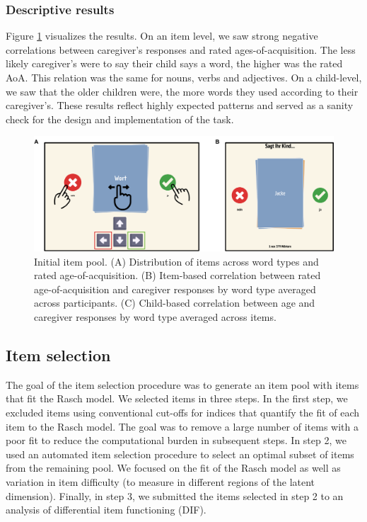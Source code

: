 \documentclass[
  man,floatsintext]{apa6}
\begin{document}
\hypertarget{descriptive-results}{%
\subsubsection{Descriptive results}\label{descriptive-results}}

Figure \ref{fig:fig2} visualizes the results. On an item level, we saw strong negative correlations between caregiver's responses and rated ages-of-acquisition. The less likely caregiver's were to say their child says a word, the higher was the rated AoA. This relation was the same for nouns, verbs and adjectives. On a child-level, we saw that the older children were, the more words they used according to their caregiver's. These results reflect highly expected patterns and served as a sanity check for the design and implementation of the task.



\begin{figure}

{\centering \includegraphics[width=1\linewidth]{../graphs/fig2} 

}

\caption{Initial item pool. (A) Distribution of items across word types and rated age-of-acquisition. (B) Item-based correlation between rated age-of-acquisition and caregiver responses by word type averaged across participants. (C) Child-based correlation between age and caregiver responses by word type averaged across items.}\label{fig:fig2}
\end{figure}

\hypertarget{item-selection}{%
\subsection{Item selection}\label{item-selection}}

The goal of the item selection procedure was to generate an item pool with items that fit the Rasch model. We selected items in three steps. In the first step, we excluded items using conventional cut-offs for indices that quantify the fit of each item to the Rasch model. The goal was to remove a large number of items with a poor fit to reduce the computational burden in subsequent steps. In step 2, we used an automated item selection procedure to select an optimal subset of items from the remaining pool. We focused on the fit of the Rasch model as well as variation in item difficulty (to measure in different regions of the latent dimension). Finally, in step 3, we submitted the items selected in step 2 to an analysis of differential item functioning (DIF).
\end{document}
